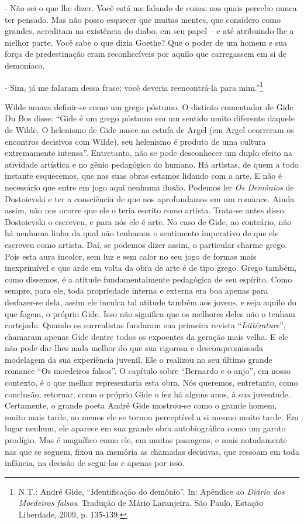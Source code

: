 - Não sei o que lhe dizer. Você está me falando de coisas nas quais
percebo nunca ter pensado. Mas não posso esquecer que muitas mentes, que
considero como grandes, acreditam na existência do diabo, em seu papel
-- e até atribuindo-lhe a melhor parte. Você sabe o que dizia Goethe?
Que o poder de um homem e sua força de predestinação eram reconhecíveis
por aquilo que carregassem em si de demoníaco.

- Sim, já me falaram dessa frase; você deveria reencontrá-la para
mim.''\footnote{N.T.: André Gide, ``Identificação do demônio''. In:
  Apêndice ao \emph{Diário dos Moedeiros falsos}. Tradução de Mário
  Laranjeira. São Paulo, Estação Liberdade, 2009, p. 135-139.}

Wilde amava definir-se como um grego póstumo. O distinto comentador de
Gide Du Bos disse: ``Gide é um grego póstumo em um sentido muito
diferente daquele de Wilde. O helenismo de Gide nasce na estufa de Argel
(em Argel ocorreram os encontros decisivos com Wilde), seu helenismo é
produto de uma cultura extremamente intensa''. Entretanto, não se pode
desconhecer um duplo efeito na atividade artística e no gênio pedagógico
do humano. Há artistas, de quem a todo instante esquecemos, que nas suas
obras estamos lidando com a arte. E não é necessário que entre em jogo
aqui nenhuma ilusão. Podemos ler \emph{Os Demônios} de Dostoievski e ter
a consciência de que nos aprofundamos em um romance. Ainda assim, não
nos ocorre que ele o teria escrito como artista. Trata-se antes disso:
Dostoievski o escreveu, e para nós ele é arte. No caso de Gide, ao
contrário, não há nenhuma linha da qual não tenhamos o sentimento
imperativo de que ele escreveu como artista. Daí, se podemos dizer
assim, o particular charme grego. Pois esta aura incolor, sem luz e sem
calor no seu jogo de formas mais inexprimível e que arde em volta da
obra de arte é de tipo grego. Grego também, como dissemos, é a atitude
fundamentalmente pedagógica de seu espírito. Como sempre, para ele, toda
propriedade interna e externa era boa apenas para desfazer-se dela,
assim ele inculca tal atitude também aos jovens, e seja aquilo do que
fogem, o próprio Gide. Isso não significa que os melhores deles não o
tenham cortejado. Quando os surrealistas fundaram sua primeira revista
``\emph{Littérature}'', chamaram apenas Gide dentre todos os expoentes
da geração mais velha. E ele não pode dar-lhes nada melhor do que sua
rigorosa e descompromissada modelagem da sua experiência juvenil. Ele o
realizou no seu último grande romance ``Os moedeiros falsos''. O
capítulo sobre ``Bernardo e o anjo'', em nosso contexto, é o que melhor
representaria esta obra. Nós queremos, entretanto, como conclusão,
retornar, como o próprio Gide o fez há alguns anos, à sua juventude.
Certamente, o grande poeta André Gide mostrou-se como o grande homem,
muito mais tarde, ao menos ele se tornou perceptível a si mesmo muito
tarde. Em lugar nenhum, ele aparece em sua grande obra autobiográfica
como um garoto prodígio. Mas é magnífico como ele, em muitas passagens,
e mais notadamente nas que se seguem, fixou na memória as chamadas
decisivas, que ressoam em toda infância, na decisão de segui-las e
apenas por isso.

